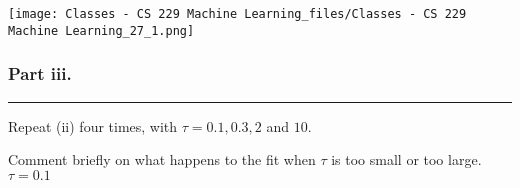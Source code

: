 \documentclass[letterpaper,10pt,english]{/usr/share/sphinx/texinputs/sphinxhowto}
\newenvironment{InvisibleVerbatim}
        {\begin{mdframed}[leftmargin=0.1\linewidth,innerleftmargin=3pt,innerrightmargin=3pt, userdefinedwidth=1\linewidth, linewidth=0pt, linecolor=white, usetwoside=false]}
        {\end{mdframed}}
\begin{document}
                \begin{InvisibleVerbatim}
                \vspace{-0.5\baselineskip}
    \begin{center}
    \texttt{[image: Classes - CS 229 Machine Learning\_files/Classes - CS 229 Machine Learning\_27\_1.png]}
    \par
    \end{center}
    
            \end{InvisibleVerbatim}
            
        
    
\subsubsection{Part iii.}

\begin{center}\rule{3in}{0.4pt}\end{center}

Repeat (ii) four times, with $\tau = 0.1, 0.3, 2$ and $10$.

Comment briefly on what happens to the fit when $\tau$ is too small or
too large.$\tau = 0.1$

\end{document}
